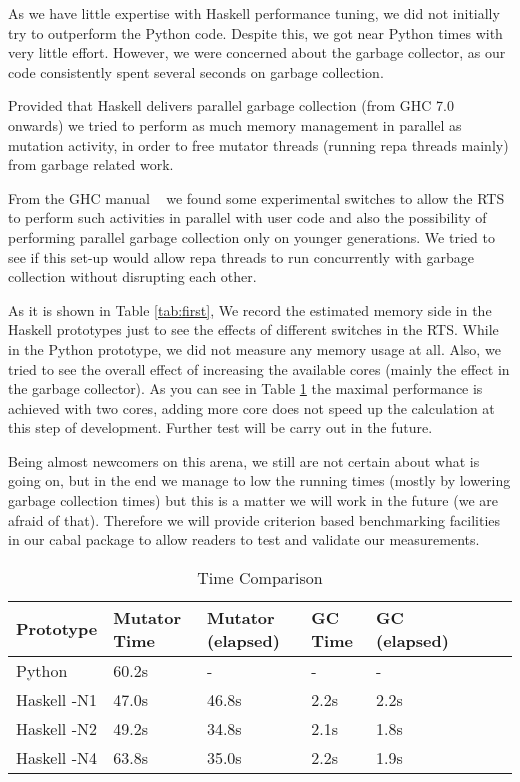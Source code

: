 \documentclass{tmr}
\begin{document}
As we have little expertise with Haskell performance tuning, we did not initially try to outperform the Python
code.  Despite this, we got near Python times with very little effort.
However, we were concerned about the garbage collector, as our code
consistently spent several seconds on garbage collection.


Provided that Haskell
delivers parallel garbage collection (from GHC 7.0 onwards) we tried to perform as much memory management in parallel
as mutation activity, in order to free mutator threads (running repa threads mainly) from garbage related work.

From the GHC manual ~\cite{ghc} we found some experimental switches to allow the RTS to perform such activities in parallel
with user code and also the possibility of performing parallel garbage collection only on younger generations.
We tried to see if this set-up would allow repa threads to run concurrently with garbage collection without  
disrupting each other.

As it is shown in Table \ref{tab:first}, We record the estimated memory side in the 
Haskell prototypes just to see the effects of different switches in the RTS. While in the Python
prototype, we did not measure any memory usage at all. Also, we tried to see the overall effect of 
increasing the available cores (mainly the effect in the garbage collector). As you can see in Table
\ref{tab:second} the maximal performance is achieved with two cores, adding more core does not speed up
the calculation at this step of development. Further test will be carry out in the future.

Being almost newcomers on this arena, we still are not certain about what is going on,
but in the end we manage to low the running times (mostly by lowering garbage collection times)
but this is a matter we will work in the future (we are afraid of that). Therefore we will
provide criterion based benchmarking facilities in our cabal package to allow 
readers to test and validate our measurements.

\begin{table}[float,captionpos=b,belowcaptionskip=4pt]
\begin{center}
    \begin{tabular}{ | l | l | l | l | l | l | l| l |}
\hline  Prototype  & Mutator Time & Mutator (elapsed) & GC Time & GC (elapsed) \\ 
\hline  Python   & 60.2s   & -      & -    & - \\
\hline  Haskell -N1 & 47.0s   & 46.8s  & 2.2s & 2.2s \\
\hline  Haskell -N2  & 49.2s   & 34.8s  & 2.1s & 1.8s \\
\hline  Haskell -N4  & 63.8s   & 35.0s  & 2.2s & 1.9s  \\
\hline
    \end{tabular} 
\end{center}
\label{tab:second}
\caption{Time Comparison}
\end{table}
\end{document}
